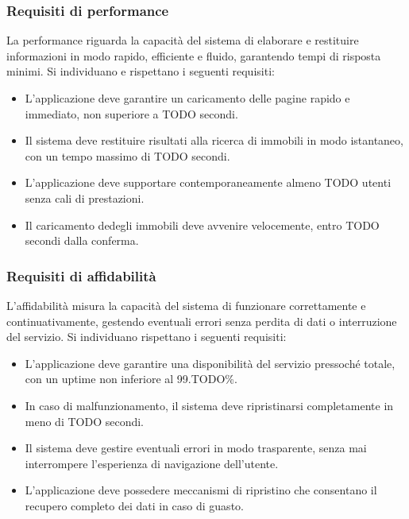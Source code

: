 \documentclass{book}
\begin{document}
\subsubsection{Requisiti di performance}
La performance riguarda la capacità del sistema di elaborare e restituire informazioni in modo rapido, efficiente e fluido, garantendo tempi di risposta minimi. Si individuano e rispettano i seguenti requisiti:
\begin{itemize}
    \item L'applicazione deve garantire un caricamento delle pagine rapido e immediato, non superiore a TODO secondi.
    \item Il sistema deve restituire risultati alla ricerca di immobili in modo istantaneo, con un tempo massimo di TODO secondi.
    \item L'applicazione deve supportare contemporaneamente almeno TODO utenti senza cali di prestazioni.
    \item Il caricamento dedegli immobili deve avvenire velocemente, entro TODO secondi dalla conferma.
\end{itemize}
\subsubsection{Requisiti di affidabilità}
L'affidabilità misura la capacità del sistema di funzionare correttamente e continuativamente, gestendo eventuali errori senza perdita di dati o interruzione del servizio. Si individuano rispettano i seguenti requisiti:
\begin{itemize}
    \item L'applicazione deve garantire una disponibilità del servizio pressoché totale, con un uptime non inferiore al 99.TODO\%.
    \item In caso di malfunzionamento, il sistema deve ripristinarsi completamente in meno di TODO secondi.
    \item Il sistema deve gestire eventuali errori in modo trasparente, senza mai interrompere l'esperienza di navigazione dell'utente.
    \item L'applicazione deve possedere meccanismi di ripristino che consentano il recupero completo dei dati in caso di guasto.
\end{itemize}
\end{document}
